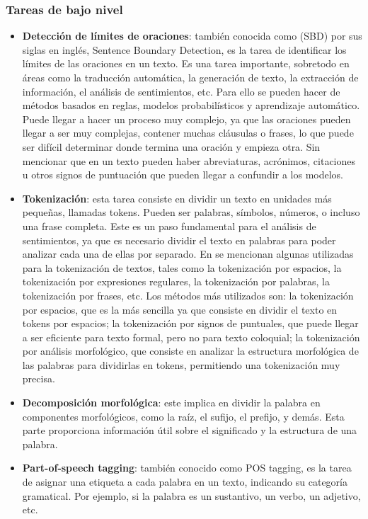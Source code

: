 \documentclass[conference]{IEEEtran}
\begin{document}
\subsubsection{Tareas de bajo nivel}
\begin{itemize}
  \item \textbf{Detección de límites de oraciones}: también conocida como (SBD) por sus siglas en inglés, Sentence Boundary Detection, es la tarea de identificar los límites de las oraciones en un texto.
  Es una tarea importante, sobretodo en áreas como la traducción automática, la generación de texto, la extracción de información, el análisis de sentimientos, etc. Para ello se pueden hacer de métodos basados en reglas, modelos probabilísticos y aprendizaje automático.
  Puede llegar a hacer un proceso muy complejo, ya que las oraciones pueden llegar a ser muy complejas, contener muchas cláusulas o frases, lo que puede ser difícil determinar donde termina una oración y empieza otra.
  Sin mencionar que en un texto pueden haber abreviaturas, acrónimos, citaciones u otros signos de puntuación que pueden llegar a confundir a los modelos.
  \item \textbf{Tokenización}: esta tarea consiste en dividir un texto en unidades más pequeñas, llamadas tokens. Pueden ser palabras, símbolos, números, o incluso una frase completa.
  Este es un paso fundamental para el análisis de sentimientos, ya que es necesario dividir el texto en palabras para poder analizar cada una de ellas por separado. En \cite{b9} se mencionan algunas utilizadas para la tokenización de textos, tales como la tokenización por espacios, la tokenización por expresiones regulares, la tokenización por palabras, la tokenización por frases, etc.
  Los métodos más utilizados son: la tokenización por espacios, que es la más sencilla ya que consiste en dividir el texto en tokens por espacios; la tokenización por signos de puntuales, que puede llegar a ser eficiente para texto formal, pero no para texto coloquial; la tokenización por análisis morfológico, que consiste en analizar la estructura morfológica de las palabras para dividirlas en tokens, permitiendo una tokenización muy precisa.
  \item \textbf{Decomposición morfológica}: este implica en dividir la palabra en componentes morfológicos, como la raíz, el sufijo, el prefijo, y demás. Esta parte proporciona información útil sobre el significado y la estructura de una palabra.
  \item \textbf{Part-of-speech tagging}: también conocido como POS tagging, es la tarea de asignar una etiqueta a cada palabra en un texto, indicando su categoría gramatical. Por ejemplo, si la palabra es un sustantivo, un verbo, un adjetivo, etc.

\end{itemize}
\end{document}
